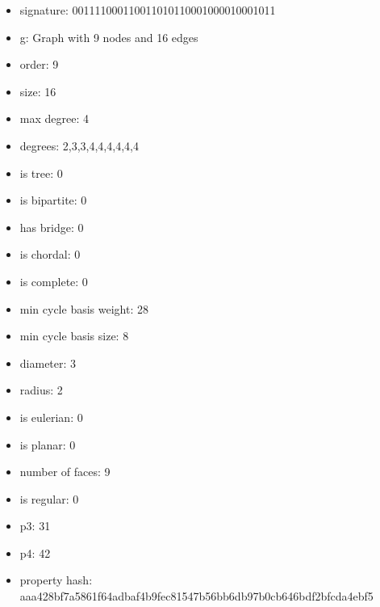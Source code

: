 \newpage
\begin{figure}
\end{figure}
\begin{itemize}
\item signature: 001111000110011010110001000010001011
\item g: Graph with 9 nodes and 16 edges
\item order: 9
\item size: 16
\item max degree: 4
\item degrees: 2,3,3,4,4,4,4,4,4
\item is tree: 0
\item is bipartite: 0
\item has bridge: 0
\item is chordal: 0
\item is complete: 0
\item min cycle basis weight: 28
\item min cycle basis size: 8
\item diameter: 3
\item radius: 2
\item is eulerian: 0
\item is planar: 0
\item number of faces: 9
\item is regular: 0
\item p3: 31
\item p4: 42
\item property hash: aaa428bf7a5861f64adbaf4b9fec81547b56bb6db97b0cb646bdf2bfcda4ebf5
\end{itemize}
